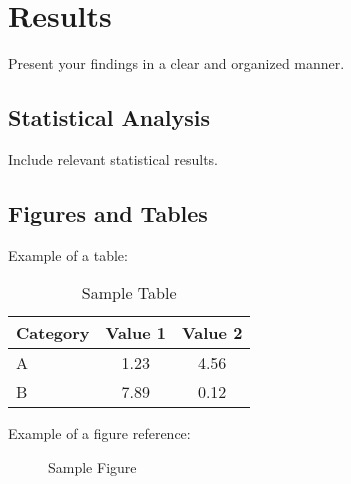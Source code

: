 \section{Results}
\label{sec:results}
Present your findings in a clear and organized manner.

\subsection{Statistical Analysis}
Include relevant statistical results.

\subsection{Figures and Tables}
Example of a table:
\begin{table}[H]
    \centering
    \caption{Sample Table}
    \label{tab:sample}
    \begin{tabular}{lcc}
        \toprule
        Category & Value 1 & Value 2 \\
        \midrule
        A & 1.23 & 4.56 \\
        B & 7.89 & 0.12 \\
        \bottomrule
    \end{tabular}
\end{table}

Example of a figure reference:
\begin{figure}[H]
    \centering
    \caption{Sample Figure}
    \label{fig:sample}
\end{figure} 